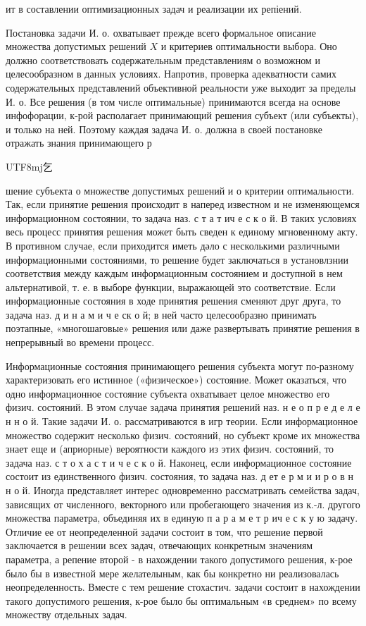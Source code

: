 \documentclass[10pt]{article}
\begin{document}
ит в составлении оптимизационных задач и реализации их репіений.



Постановка задачи И. о. охватывает прежде всего формальное описание множества допустимых решений $X$ и критериев оптимальности выбора. Оно должно соответствовать содержательным представлениям о возможном и целесообразном в данных условиях. Напротив, проверка адекватности самих содержательных представлений объективной реальности уже выходит за пределы И. о. Все решения (в том числе оптимальные) принимаются всегда на основе инфофорации, к-рой располагает принимающий решения субъект (или субъекты), и только на ней. Поэтому каждая задача И. о. должна в своей постановке отражать знания принимающего р\begin{CJK}{UTF8}{mj}乞\end{CJK}шение субъекта о множестве допустимых решений и о критерии оптимальности. Так, если принятие решения происходит в наперед известном и не изменяющемся информационном состоянии, то задача наз. с т а т ич е с к о й. В таких условиях весь процесс принятия решения может быть сведен к единому мгновенному акту. В противном случае, если приходится иметь дәло с несколькими различными информационными состояниями, то решение будет заключаться в установлзнии соответствия между каждым информационным состоянием и доступной в нем альтернативой, т. е. в выборе функции, выражающей это соответствие. Если информационные состояния в ходе принятия решения сменяют друг друга, то задача наз. д и н а м и ч е ск о й; в ней часто целесообразно принимать поэтапные, «многошаговые» решения или даже развертывать принятие решения в непрерывный во времени процесс.



Информационные состояния принимающего решения субъекта могут по-разному характеризовать его истинное («физическое») состояние. Может оказаться, что одно информационное состояние субъекта охватывает целое множество его физич. состояний. В этом случае задача принятия решений наз. н е о п р е д е л е н н о й. Такие задачи И. о. рассматриваются в игр теории. Если информационное множество содержит несколько физич. состояний, но субъект кроме их множества знает еще и (априорные) вероятности каждого из этих физич. состояний, то задача наз. с т о х а с т и ч е с к о й. Наконец, если информационное состояние состоит из единственного физич. состояния, то задача наз. д ет е р м и и р о в н н о й. Иногда представляет интерес одновременно рассматривать семейства задач, зависящих от численного, векторного или пробегающего значения из к.-л. другого множества параметра, объединяя их в единую п а р а м е т р ич е с к у ю задачу. Отличие ее от неопределенной задачи состоит в том, что решение первой заключается в решении всех задач, отвечающих конкретным значениям параметра, а репение второй - в нахождении такого допустимого решения, к-рое было бы в известной мере желателыным, как бы конкретно ни реализовалась неопределенность. Вместе с тем решение стохастич. задачи состоит в нахождении такого допустимого решения, к-рое было бы оптимальным «в среднем» по всему множеству отдельных задач.
\end{document}
